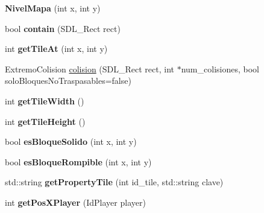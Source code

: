 \begin{DoxyCompactItemize}
\item 
{\bfseries Nivel\+Mapa} (int x, int y)\hypertarget{class_nivel_mapa_ad890496fcfa8dcff7b511f24b1cfd39b}{}\label{class_nivel_mapa_ad890496fcfa8dcff7b511f24b1cfd39b}

\item 
bool {\bfseries contain} (S\+D\+L\+\_\+\+Rect rect)\hypertarget{class_nivel_mapa_ae94e6ce184a768fb34c1b119f9acb2ed}{}\label{class_nivel_mapa_ae94e6ce184a768fb34c1b119f9acb2ed}

\item 
int {\bfseries get\+Tile\+At} (int x, int y)\hypertarget{class_nivel_mapa_a25f7e94605919f131b50746eba3b0f49}{}\label{class_nivel_mapa_a25f7e94605919f131b50746eba3b0f49}

\item 
Extremo\+Colision \hyperlink{class_nivel_mapa_a0b1cd448c578ca8f05a8e63e1110f6a9}{colision} (S\+D\+L\+\_\+\+Rect rect, int $\ast$num\+\_\+colisiones, bool solo\+Bloques\+No\+Traspasables=false)
\item 
int {\bfseries get\+Tile\+Width} ()\hypertarget{class_nivel_mapa_affc2d4a666934e4bdf54c8816d12860c}{}\label{class_nivel_mapa_affc2d4a666934e4bdf54c8816d12860c}

\item 
int {\bfseries get\+Tile\+Height} ()\hypertarget{class_nivel_mapa_a7e67766d3c671e267d3d04eca4578085}{}\label{class_nivel_mapa_a7e67766d3c671e267d3d04eca4578085}

\item 
bool {\bfseries es\+Bloque\+Solido} (int x, int y)\hypertarget{class_nivel_mapa_a2af0b654e04be495e657eb8d59c89840}{}\label{class_nivel_mapa_a2af0b654e04be495e657eb8d59c89840}

\item 
bool {\bfseries es\+Bloque\+Rompible} (int x, int y)\hypertarget{class_nivel_mapa_a32d0d369415ccae82fcacee60a0fdf41}{}\label{class_nivel_mapa_a32d0d369415ccae82fcacee60a0fdf41}

\item 
std\+::string {\bfseries get\+Property\+Tile} (int id\+\_\+tile, std\+::string clave)\hypertarget{class_nivel_mapa_a62da61549a499de02cf3a4bd8d756911}{}\label{class_nivel_mapa_a62da61549a499de02cf3a4bd8d756911}

\item 
int {\bfseries get\+Pos\+X\+Player} (Id\+Player player)\hypertarget{class_nivel_mapa_a5973180597daa732fdbdbf39f4edb21c}{}\label{class_nivel_mapa_a5973180597daa732fdbdbf39f4edb21c}


\end{DoxyCompactItemize}
